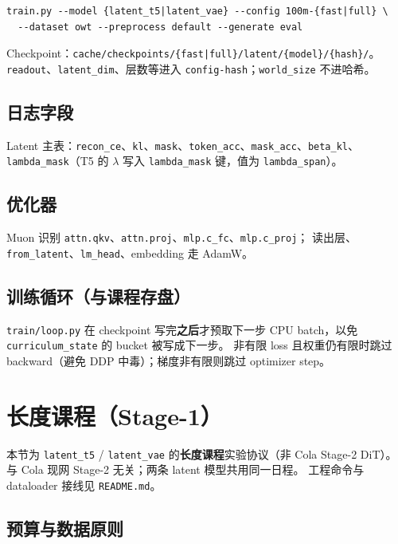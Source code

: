 \documentclass[UTF8,a4paper,11pt]{ctexart}
\begin{document}
\begin{verbatim}
train.py --model {latent_t5|latent_vae} --config 100m-{fast|full} \
  --dataset owt --preprocess default --generate eval
\end{verbatim}

Checkpoint：\texttt{cache/checkpoints/\{fast|full\}/latent/\{model\}/\{hash\}/}。
\texttt{readout}、\texttt{latent\_dim}、层数等进入 \texttt{config-hash}；\texttt{world\_size} 不进哈希。

\subsection{日志字段}

Latent 主表：\texttt{recon\_ce}、\texttt{kl}、\texttt{mask}、\texttt{token\_acc}、\texttt{mask\_acc}、\texttt{beta\_kl}、\texttt{lambda\_mask}（T5 的 $\lambda$ 写入 \texttt{lambda\_mask} 键，值为 \texttt{lambda\_span}）。

\subsection{优化器}

Muon 识别 \texttt{attn.qkv}、\texttt{attn.proj}、\texttt{mlp.c\_fc}、\texttt{mlp.c\_proj}；
读出层、\texttt{from\_latent}、\texttt{lm\_head}、embedding 走 AdamW。

\subsection{训练循环（与课程存盘）}

\texttt{train/loop.py} 在 checkpoint 写完\textbf{之后}才预取下一步 CPU batch，以免 \texttt{curriculum\_state} 的 bucket 被写成下一步。
非有限 loss 且权重仍有限时跳过 backward（避免 DDP 中毒）；梯度非有限则跳过 optimizer step。

\section{长度课程（Stage-1）}
\label{sec:curriculum}

本节为 \texttt{latent\_t5} / \texttt{latent\_vae} 的\textbf{长度课程}实验协议（非 Cola Stage-2 DiT）。
与 Cola 现网 Stage-2 无关；两条 latent 模型共用同一日程。
工程命令与 dataloader 接线见 \texttt{README.md}。

\subsection{预算与数据原则}
\end{document}
